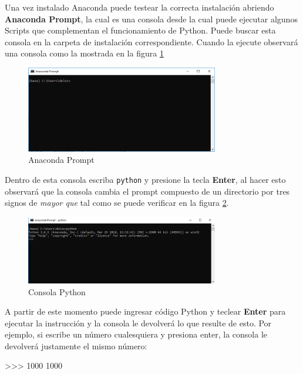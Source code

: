 Una vez instalado Anaconda puede testear la correcta instalación abriendo \textbf{Anaconda Prompt}, la cual es 
una consola desde la cual puede ejecutar algunos Scripts que complementan el funcionamiento de Python. Puede 
buscar esta consola en la carpeta de instalación correspondiente. Cuando la ejecute observará una consola 
como la mostrada en la figura \ref{fig:anaconda_prompt}

\begin{figure}[h!]
	\centering
	\includegraphics[width=0.75\textwidth]{img/ch01/anaconda_prompt.png}
	\caption{Anaconda Prompt}
	\label{fig:anaconda_prompt}
\end{figure}

Dentro de esta consola escriba \texttt{python} y presione la tecla \textbf{Enter}, al hacer esto observará 
que la consola cambia el prompt compuesto de un directorio por tres signos de \textit{mayor que} tal como 
se puede verificar en la figura \ref{fig:anaconda_prompt_python}.

\begin{figure}[h!]
	\centering
	\includegraphics[width=0.75\textwidth]{img/ch01/anaconda_prompt_python.png}
	\caption{Consola Python}
	\label{fig:anaconda_prompt_python}
\end{figure}

A partir de este momento puede ingresar código Python y teclear \textbf{Enter} para ejecutar la instrucción  
y la consola le devolverá lo que resulte de esto. Por ejemplo, si escribe un número cualesquiera y presiona enter, 
la consola le devolverá justamente el mismo número:

\begin{python}
>>> 1000
1000
\end{python}

